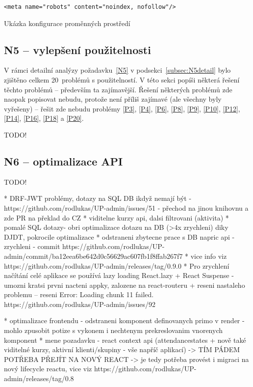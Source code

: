 \begin{listing}[ht]
	\begin{verbatim}
<meta name="robots" content="noindex, nofollow"/>
	\end{verbatim}
	\caption{Ukázka konfigurace proměnných prostředí}\label{lst:robots}
\end{listing}

\subsection{N5 -- vylepšení použitelnosti}

 V rámci detailní analýzy požadavku~\ref{N5} v podsekci~\ref{subsec:N5detail} bylo zjištěno celkem 20~problémů s použitelností. V této sekci popíši některá řešení těchto problémů -- především ta zajímavější. Řešení některých problémů zde naopak popisovat nebudu, protože není příliš zajímavé (ale všechny byly vyřešeny) -- řešit zde nebudu problémy \ref{P3}, \ref{P4}, \ref{P6}, \ref{P8}, \ref{P9}, \ref{P10}, \ref{P12}, \ref{P14}, \ref{P16}, \ref{P18} a \ref{P20}.
 
 TODO!

\subsection{N6 -- optimalizace API}

TODO!

* DRF-JWT problémy, dotazy na SQL DB ikdyž nemají být - https://github.com/rodlukas/UP-admin/issues/51 - přechod na jinou knihovnu a zde PR na překlad do CZ
* viditelne kurzy api, dalsi filtrovani (aktivita)
* pomalé SQL dotazy- obri optimalizace dotazu na DB (>4x zrychleni) diky DJDT, pokrocile optimalizace
* odstraneni zbytecne prace s DB napric api - zrychleni - commit https://github.com/rodlukas/UP-admin/commit/ba12eea6be642d0c56629ac607fb1f8ffab267f7
* vice info viz https://github.com/rodlukas/UP-admin/releases/tag/0.9.0
* Pro zrychlení načítání celé aplikace se používá lazy loading React.lazy + React Suspense - umozni kratsi prvni nacteni appky, zalozene na react-routeru + reseni nastaleho problemu -- reseni Error: Loading chunk 11 failed. https://github.com/rodlukas/UP-admin/issues/92

* optimalizace frontendu - odstraneni komponent definovanych primo v render - mohlo zpusobit potize s vykonem i nechtenym prekreslovanim vnorenych komponent
* mene pozadavku - react context api (attendancestates + nově také viditelné kurzy, aktivní klienti/skupiny - vše napříč aplikací) -> TÍM PÁDEM POTŘEBA PŘEJÍT NA NOVÝ REACT -> je tedy potřeba provést i migraci na nový lifecycle reactu, vice viz https://github.com/rodlukas/UP-admin/releases/tag/0.8


